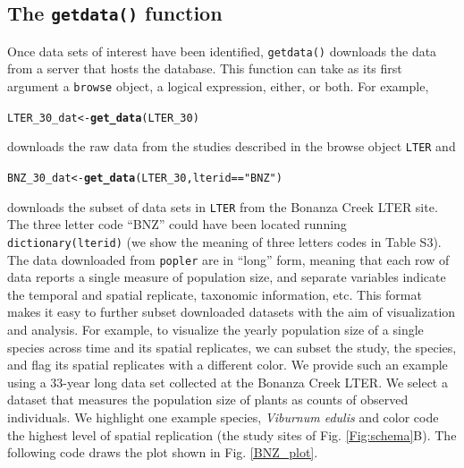 \documentclass{article}\usepackage[]{graphicx}\usepackage[]{color}
\makeatletter
\newcommand{\hlstr}[1]{\textcolor[rgb]{0.192,0.494,0.8}{#1}}%
\newcommand{\hlopt}[1]{\textcolor[rgb]{0,0,0}{#1}}%
\newcommand{\hlstd}[1]{\textcolor[rgb]{0.345,0.345,0.345}{#1}}%
\newcommand{\hlkwb}[1]{\textcolor[rgb]{0.69,0.353,0.396}{#1}}%
\newcommand{\hlkwd}[1]{\textcolor[rgb]{0.737,0.353,0.396}{\textbf{#1}}}%
\newenvironment{kframe}{%
 \def\at@end@of@kframe{}%
 \ifinner\ifhmode%
  \def\at@end@of@kframe{\end{minipage}}%
  \begin{minipage}{\columnwidth}%
 \fi\fi%
 \def\FrameCommand##1{\hskip\@totalleftmargin \hskip-\fboxsep
 \colorbox{shadecolor}{##1}\hskip-\fboxsep
     \hskip-\linewidth \hskip-\@totalleftmargin \hskip\columnwidth}%
 \MakeFramed {\advance\hsize-\width
   \@totalleftmargin\z@ \linewidth\hsize
   \@setminipage}}%
 {\par\unskip\endMakeFramed%
 \at@end@of@kframe}
\newenvironment{knitrout}{}{} %
\newcommand{\tom}[1]{{\textit{\color{red}{[#1]}}}}
\makeatother
\begin{document}
\subsection*{The \texttt{get\textunderscore data()} function}
\tom{Random observation: the study titles in popler are sometimes in quotes, sometimes not. This should be cleaned up. Also I would like to edit the default message of getdata() before we publish.}

Once data sets of interest have been identified, \texttt{get\textunderscore data()} downloads the data from a server that hosts the database. This function can take as its first argument a \texttt{browse} object, a logical expression, either, or both. For example, %
\begin{knitrout}
\color{fgcolor}\begin{kframe}
\begin{alltt}
\hlstd{LTER_30_dat} \hlkwb{<-} \hlkwd{get_data}\hlstd{(LTER_30)}
\end{alltt}
\end{kframe}
\end{knitrout}
downloads the raw data from the studies described in the browse object \texttt{LTER} and 
\begin{knitrout}
\color{fgcolor}\begin{kframe}
\begin{alltt}
\hlstd{BNZ_30_dat} \hlkwb{<-} \hlkwd{get_data}\hlstd{(LTER_30,lterid} \hlopt{==} \hlstr{"BNZ"}\hlstd{)}
\end{alltt}
\end{kframe}
\end{knitrout}
downloads the subset of data sets in \texttt{LTER} from the Bonanza Creek LTER site. The three letter code ``BNZ'' could have been located running \texttt{dictionary(lterid)} (we show the meaning of three letters codes in Table S3). The data downloaded from \texttt{popler} are in ``long'' form, meaning that each row of data reports a single measure of population size, and separate variables indicate the temporal and spatial replicate, taxonomic information, etc. This format makes it easy to further subset downloaded datasets with the aim of visualization and analysis. For example, to visualize the yearly population size of a single species across time and its spatial replicates, we can subset the study, the species, and flag its spatial replicates with a different color. We provide such an example using a 33-year long data set collected at the Bonanza Creek LTER. We select a dataset that measures the population size of plants as counts of observed individuals. We highlight one example species, \textit{Viburnum edulis} \tom{Aldo wrote: ???} and color code the highest level of spatial replication (the study sites of Fig. \ref{Fig:schema}B). The following code draws the plot shown in Fig. \ref{BNZ_plot}.
\end{document}
